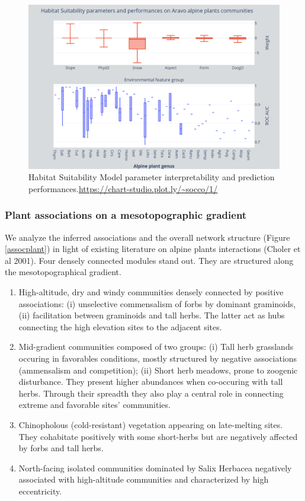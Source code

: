 \documentclass[]{article}
\begin{document}
\begin{figure}[H]
	\centering
	\includegraphics[scale=0.22]{hsmaravo}
	\caption{Habitat Suitability Model parameter interpretability and prediction performances.\url{https://chart-studio.plot.ly/~socco/1/}}
	\label{hsmaravo}
\end{figure}

\subsubsection{Plant associations on a mesotopographic gradient}
We analyze the inferred associations and the overall network structure (Figure \ref{assocplant}) in light of existing literature on alpine plants interactions (Choler et al 2001). Four densely connected modules stand out. They are structured along the mesotopographical gradient. 
\begin{enumerate}
	\item High-altitude, dry and windy communities densely connected by positive associations: (i) unselective commensalism of forbs by dominant graminoids, (ii) facilitation between graminoids and tall herbs. The latter act as hubs connecting the high elevation sites to the adjacent sites. 
	\item Mid-gradient communities composed of two groups: (i) Tall herb grasslands occuring in favorables conditions, mostly structured by negative associations (ammensalism and competition); (ii) Short herb meadows, prone to zoogenic disturbance. They present higher abundances when co-occuring with tall herbs. Through their spreadth they also play a central role in connecting extreme and favorable sites' communities. 
	\item Chinopholous (cold-resistant) vegetation appearing on late-melting sites. They cohabitate positively with some short-herbs but are negatively affected by forbs and tall herbs. 
	\item North-facing isolated communities dominated by Salix Herbacea negatively associated with high-altitude communities and characterized by high eccentricity.
\end{enumerate}
\end{document}
